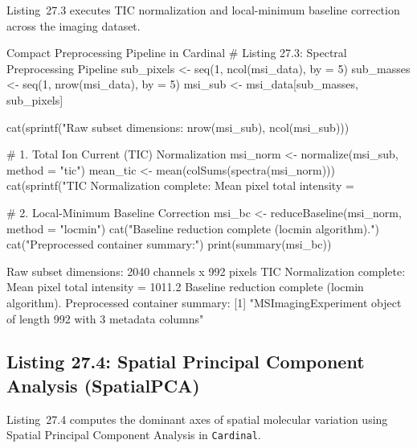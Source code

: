 \documentclass[11pt,twoside,openright]{book}
\begin{document}
Listing~27.3 executes TIC normalization and local-minimum baseline correction across the imaging dataset.

\begin{rchunk}{Compact Preprocessing Pipeline in Cardinal}
# Listing 27.3: Spectral Preprocessing Pipeline
sub_pixels <- seq(1, ncol(msi_data), by = 5)
sub_masses <- seq(1, nrow(msi_data), by = 5)
msi_sub    <- msi_data[sub_masses, sub_pixels]

cat(sprintf("Raw subset dimensions: %
            nrow(msi_sub), ncol(msi_sub)))

# 1. Total Ion Current (TIC) Normalization
msi_norm <- normalize(msi_sub, method = "tic")
mean_tic <- mean(colSums(spectra(msi_norm)))
cat(sprintf("TIC Normalization complete: Mean pixel total intensity = %

# 2. Local-Minimum Baseline Correction
msi_bc <- reduceBaseline(msi_norm, method = "locmin")
cat("Baseline reduction complete (locmin algorithm).\n")
cat("Preprocessed container summary:\n")
print(summary(msi_bc))
\end{rchunk}

\begin{routput}
Raw subset dimensions: 2040 channels x 992 pixels
TIC Normalization complete: Mean pixel total intensity = 1011.2
Baseline reduction complete (locmin algorithm).
Preprocessed container summary:
{}[1] "MSImagingExperiment object of length 992 with 3 metadata columns"
\end{routput}

\subsection{Listing 27.4: Spatial Principal Component Analysis (SpatialPCA)}

Listing~27.4 computes the dominant axes of spatial molecular variation using Spatial Principal Component Analysis in \texttt{Cardinal}.

\end{document}
